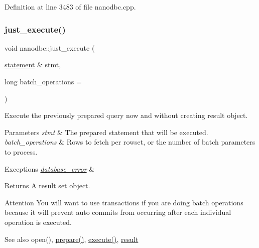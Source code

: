 Definition at line 3483 of file nanodbc.\+cpp.

\mbox{\label{group__mainf_gafa9051df00f710f9d4123dc24896d821}} 
\subsubsection{\texorpdfstring{just\_execute()}{just\_execute()}\hspace{0.1cm}{\footnotesize\ttfamily [2/2]}}
{\footnotesize\ttfamily void nanodbc\+::just\+\_\+execute (\begin{DoxyParamCaption}\item[{\mbox{\hyperlink{classnanodbc_1_1statement}{statement}} \&}]{stmt,  }\item[{long}]{batch\+\_\+operations = {} }\end{DoxyParamCaption})}



Execute the previously prepared query now and without creating result object. 


\begin{DoxyParams}{Parameters}
{\em stmt} & The prepared statement that will be executed. \\
\hline
{\em batch\+\_\+operations} & Rows to fetch per rowset, or the number of batch parameters to process. \\
\hline
\end{DoxyParams}

\begin{DoxyExceptions}{Exceptions}
{\em \mbox{\hyperlink{classnanodbc_1_1database__error}{database\+\_\+error}}} & \\
\hline
\end{DoxyExceptions}
\begin{DoxyReturn}{Returns}
A result set object. 
\end{DoxyReturn}
\begin{DoxyAttention}{Attention}
You will want to use transactions if you are doing batch operations because it will prevent auto commits from occurring after each individual operation is executed. 
\end{DoxyAttention}
\begin{DoxySeeAlso}{See also}
open(), \mbox{\hyperlink{group__mainf_ga961a75629487f22ebc87d114c5699bc2}{prepare()}}, \mbox{\hyperlink{group__mainf_ga5cbac617a3964611bd16a2fc6f991b83}{execute()}}, \mbox{\hyperlink{classnanodbc_1_1result}{result}} 
\end{DoxySeeAlso}



